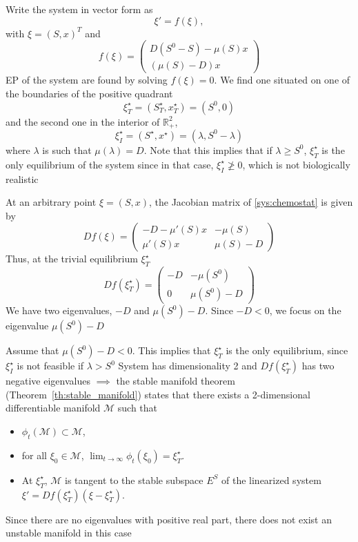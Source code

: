 \documentclass{beamer}
\def\IR{\mathbb{R}}
\begin{document}
\begin{frame}
Write the system in vector form as
\[
\xi'=f(\xi),
\]
with $\xi=(S,x)^T$ and
\[
f(\xi)=
\begin{pmatrix}
D(S^0-S)-\mu(S)x \\
(\mu(S)-D)x
\end{pmatrix}
\]
EP of the system are found by solving $f(\xi)=0$. We find one situated on one of the boundaries of the positive quadrant
\[
\xi_T^\star=(S^\star_T,x^\star_T)=\left(S^0,0\right)
\]
and the second one in the interior of $\IR_+^2$,
\[
\xi_I^\star=(S^\star,x^\star)=\left(\lambda,S^0-\lambda\right)
\]
where $\lambda$ is such that $\mu(\lambda)=D$. Note that this implies
that if $\lambda\geq S^0$, $\xi_T^\star$ is the only equilibrium of the
system since in that case, $\xi_I^\star\not\geq 0$, which is not biologically realistic
\end{frame}

\begin{frame}
At an arbitrary point $\xi=(S,x)$, the Jacobian matrix of \eqref{sys:chemostat} is given by
\[
Df(\xi)=\left(
\begin{matrix}
-D-\mu'(S)x & -\mu(S) \\
\mu'(S)x & \mu(S)-D
\end{matrix}
\right)
\]
Thus, at the trivial equilibrium $\xi_T^\star$
\[
Df(\xi_T^\star)=
\left(
\begin{matrix}
-D & -\mu(S^0) \\
0 & \mu(S^0)-D
\end{matrix}
\right)
\]
We have two eigenvalues, $-D$ and $\mu(S^0)-D$.
Since $-D<0$, we focus on the eigenvalue $\mu(S^0)-D$
\end{frame}

\begin{frame}
Assume that
$\mu(S^0)-D<0$. This implies that $\xi_T^\star$ is the only
equilibrium, since $\xi_I^\star$ is not feasible
if $\lambda>S^0$
\vfill
System has dimensionality 2 and $Df(\xi_T^\star)$
has two negative eigenvalues $\implies$ the stable manifold theorem
(Theorem~\ref{th:stable_manifold}) states that there exists a
2-dimensional differentiable manifold $\mathcal{M}$ such that
\begin{itemize}
\item $\phi_t(\mathcal{M})\subset\mathcal{M}$,
\item for all $\xi_0\in\mathcal{M}$,
$\lim_{t\to\infty}\phi_t(\xi_0)=\xi_T^\star$.
\item At $\xi_T^\star$, $\mathcal{M}$ is tangent to the stable subspace
$E^S$ of the linearized system $\xi'=Df(\xi_T^\star)(\xi-\xi_T^\star)$.
\end{itemize}
Since there are no eigenvalues with positive real part, there does not
exist an unstable manifold in this case 
\end{frame}
\end{document}
